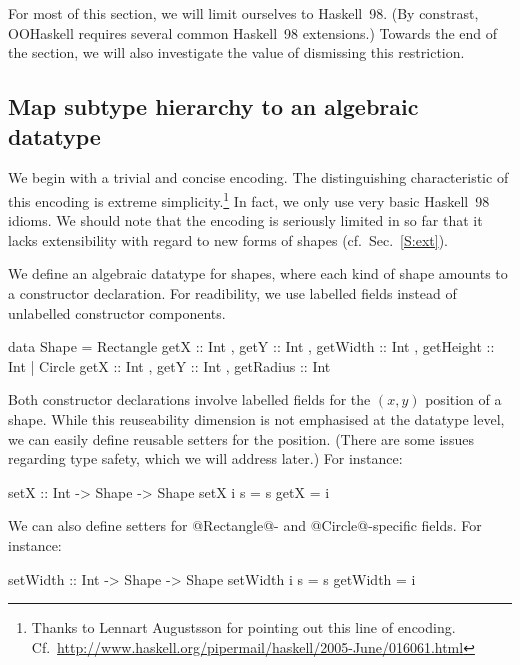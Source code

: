 \documentclass{jfp}
\begin{document}
For most of this section, we will limit ourselves to Haskell~98. (By
constrast, OOHaskell requires several common Haskell~98 extensions.) 
Towards the end of the section, we will also investigate the value of
dismissing this restriction.



\subsection{Map subtype hierarchy to an algebraic datatype}
\label{S:lennart}

We begin with a trivial and concise encoding. The distinguishing
characteristic of this encoding is extreme simplicity.\footnote{Thanks
to Lennart Augustsson for pointing out this line of encoding.\\
Cf.\
\url{http://www.haskell.org/pipermail/haskell/2005-June/016061.html}}
In fact, we only use very basic Haskell~98 idioms. We should note that
the encoding is seriously limited in so far that it lacks
extensibility with regard to new forms of shapes (cf.\ Sec.~\ref{S:ext}).

We define an algebraic datatype for shapes, where each kind of shape
amounts to a constructor declaration. For readibility, we use labelled
fields instead of unlabelled constructor components.

\begin{code}
 data Shape =
              Rectangle { getX      :: Int
                        , getY      :: Int 
                        , getWidth  :: Int 
                        , getHeight :: Int }
            |
              Circle { getX      :: Int
                     , getY      :: Int 
                     , getRadius :: Int }
\end{code}

Both constructor declarations involve labelled fields for the $(x,y)$
position of a shape. While this reuseability dimension is not
emphasised at the datatype level, we can easily define reusable
setters for the position.  (There are some issues regarding type
safety, which we will address later.) For instance:

\begin{code}
 setX :: Int -> Shape -> Shape
 setX i s = s { getX = i } 
\end{code}

We can also define setters for @Rectangle@- and @Circle@-specific
fields. For instance:

\begin{code}
 setWidth :: Int -> Shape -> Shape
 setWidth i s = s { getWidth = i } 
\end{code}
\end{document}
